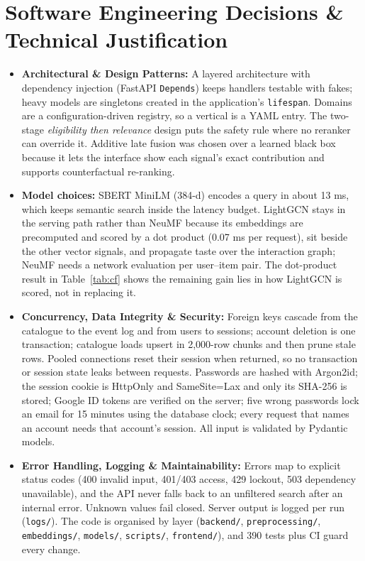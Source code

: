 \documentclass[11pt, a4paper]{article}
\begin{document}
\section{Software Engineering Decisions \& Technical Justification}
\begin{itemize}[noitemsep, topsep=2pt]
    \item \textbf{Architectural \& Design Patterns:} A layered architecture with dependency injection (FastAPI \texttt{Depends}) keeps handlers testable with fakes; heavy models are singletons created in the application's \texttt{lifespan}. Domains are a configuration-driven registry, so a vertical is a YAML entry. The two-stage \emph{eligibility then relevance} design puts the safety rule where no reranker can override it. Additive late fusion was chosen over a learned black box because it lets the interface show each signal's exact contribution and supports counterfactual re-ranking.
    \item \textbf{Model choices:} SBERT MiniLM (384-d) encodes a query in about 13 ms, which keeps semantic search inside the latency budget. LightGCN stays in the serving path rather than NeuMF because its embeddings are precomputed and scored by a dot product (0.07 ms per request), sit beside the other vector signals, and propagate taste over the interaction graph; NeuMF needs a network evaluation per user--item pair. The dot-product result in Table~\ref{tab:cf} shows the remaining gain lies in how LightGCN is scored, not in replacing it.
    \item \textbf{Concurrency, Data Integrity \& Security:} Foreign keys cascade from the catalogue to the event log and from users to sessions; account deletion is one transaction; catalogue loads upsert in 2,000-row chunks and then prune stale rows. Pooled connections reset their session when returned, so no transaction or session state leaks between requests. Passwords are hashed with Argon2id; the session cookie is HttpOnly and SameSite=Lax and only its SHA-256 is stored; Google ID tokens are verified on the server; five wrong passwords lock an email for 15 minutes using the database clock; every request that names an account needs that account's session. All input is validated by Pydantic models.
    \item \textbf{Error Handling, Logging \& Maintainability:} Errors map to explicit status codes (400 invalid input, 401/403 access, 429 lockout, 503 dependency unavailable), and the API never falls back to an unfiltered search after an internal error. Unknown values fail closed. Server output is logged per run (\texttt{logs/}). The code is organised by layer (\texttt{backend/}, \texttt{preprocessing/}, \texttt{embeddings/}, \texttt{models/}, \texttt{scripts/}, \texttt{frontend/}), and 390 tests plus CI guard every change.
\end{itemize}
\end{document}
